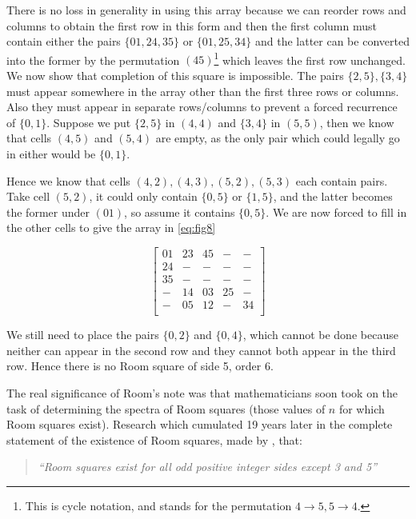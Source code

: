 \documentclass[
  11pt,
  a4paper]{book}
\begin{document}
There is no loss in generality in using this array because we can
reorder rows and columns to obtain the first row in this form and then
the first column must contain either the pairs \(\{01, 24, 35\}\) or
\(\{01, 25, 34\}\) and the latter can be converted into the former by
the permutation \((45)\)\footnote{This is cycle notation, and stands for
  the permutation \(4 \rightarrow 5, 5 \rightarrow 4\).} which leaves
the first row unchanged. We now show that completion of this square is
impossible. The pairs \(\{2,5\},\{3,4\}\) must appear somewhere in the
array other than the first three rows or columns. Also they must appear
in separate rows/columns to prevent a forced recurrence of \(\{0, 1\}\).
Suppose we put \(\{2, 5\}\) in \((4, 4)\) and \(\{3, 4\}\) in
\((5, 5)\), then we know that cells \((4, 5)\) and \((5, 4)\) are empty,
as the only pair which could legally go in either would be \(\{0, 1\}\).

Hence we know that cells \((4, 2), (4, 3), (5, 2), (5, 3)\) each contain
pairs. Take cell \((5, 2)\), it could only contain \(\{0, 5\}\) or
\(\{1, 5\}\), and the latter becomes the former under \((01)\), so
assume it contains \(\{0, 5\}\). We are now forced to fill in the other
cells to give the array in \eqref{eq:fig8}

\begin{equation}
  \label{eq:fig8}
  \begin{bmatrix}
    01 & 23 & 45 &  - & -  \\
    24 &  - &  - &  - & -  \\
    35 &  - &  - &  - & -  \\
     - & 14 & 03 & 25 & -  \\
     - & 05 & 12 &  - & 34 \\
  \end{bmatrix}
\end{equation}

We still need to place the pairs \(\{0, 2\}\) and \(\{0, 4\}\), which
cannot be done because neither can appear in the second row and they
cannot both appear in the third row. Hence there is no Room square of
side 5, order 6.

The real significance of Room's note was that mathematicians soon took
on the task of determining the spectra of Room squares (those values of
\(n\) for which Room squares exist). Research which cumulated 19 years
later in the complete statement of the existence of Room squares, made
by \textcite{wallis_solution_1974}, that:

\begin{quote}
\emph{``Room squares exist for all odd positive integer sides except 3
and 5''}
\end{quote}
\end{document}
